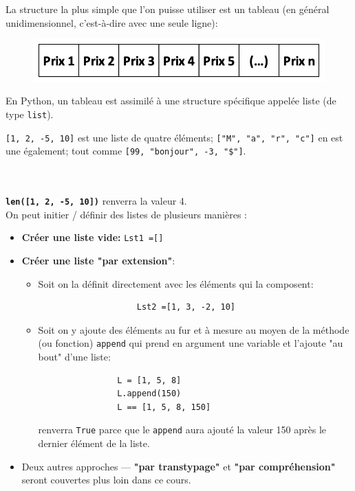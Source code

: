 \documentclass[12pt]{article}
\begin{document}
	La structure la plus simple que l'on puisse utiliser est un tableau (en général unidimensionnel, c’est-à-dire avec une seule ligne):
	
	\begin{figure}[H]
		\centering
		\includegraphics[scale=0.5]{018_TabUniDim.png}
	\end{figure}	

	En Python, un tableau est assimilé à une structure spécifique appelée liste (de type \texttt{list}).
	
	\noindent
	
	\texttt{[1, 2, -5, 10]} est une liste de quatre éléments; \texttt{["M", "a", "r", "c"]} en est une également; tout comme \texttt{[99, "bonjour", -3, "\$"]}.  
	\\
	\\
	\\
	\noindent
	
	\texttt{\textbf{len([1, 2, -5, 10])}} renverra la valeur 4.
	\\
	
	On peut initier / définir des listes de plusieurs manières :
	\begin{itemize}
		\item \textbf{Créer une liste vide:}
		\texttt{Lst1  =[]}
		\item \textbf{Créer une liste "par extension"}:
		\begin{itemize}
			\item Soit on la définit directement avec les éléments qui la composent:
				\begin{verbatim}
					Lst2 =[1, 3, -2, 10]
				\end{verbatim}
			\item Soit on y ajoute des éléments au fur et à mesure au moyen de la méthode (ou fonction) \texttt{append} qui prend en argument une variable et l'ajoute "au bout" d'une liste:
			\begin{verbatim}
				L = [1, 5, 8]
				L.append(150)
				L == [1, 5, 8, 150]
			\end{verbatim}
			renverra \texttt{True} parce que le \texttt{append} aura ajouté la valeur 150 après le dernier élément de la liste.
		\end{itemize}
		\item Deux autres approches --- \textbf{"par transtypage"} et \textbf{"par compréhension"} seront couvertes plus loin dans ce cours.		
	\end{itemize}
	\leavevmode
	\\
	
\end{document}
